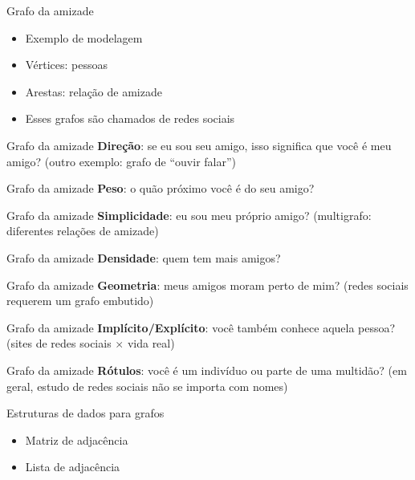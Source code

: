 \documentclass[10pt]{beamer}
\begin{document}
\begin{frame}{Grafo da amizade}
  \LARGE
  \begin{itemize}
    \item Exemplo de modelagem
    \item Vértices: pessoas
    \item Arestas: relação de amizade
    \item Esses grafos são chamados de redes sociais
  \end{itemize}
\end{frame}

\begin{frame}{Grafo da amizade}
  \huge
  \textbf{Direção}: se eu sou seu amigo, isso significa que você é meu amigo? (outro exemplo: grafo de ``ouvir falar'')
\end{frame}

\begin{frame}{Grafo da amizade}
  \huge
  \textbf{Peso}: o quão próximo você é do seu amigo?
\end{frame}

\begin{frame}{Grafo da amizade}
  \huge
  \textbf{Simplicidade}: eu sou meu próprio amigo? (multigrafo: diferentes relações de amizade)
\end{frame}

\begin{frame}{Grafo da amizade}
  \huge
  \textbf{Densidade}: quem tem mais amigos?
\end{frame}

\begin{frame}{Grafo da amizade}
  \huge
  \textbf{Geometria}: meus amigos moram perto de mim? (redes sociais requerem um grafo embutido)
\end{frame}

\begin{frame}{Grafo da amizade}
  \huge
  \textbf{Implícito/Explícito}: você também conhece aquela pessoa? (sites de redes sociais $\times$ vida real)
\end{frame}

\begin{frame}{Grafo da amizade}
  \huge
  \textbf{Rótulos}: você é um indivíduo ou parte de uma multidão? (em geral, estudo de redes sociais não se importa com nomes)
  \vfill
  \large
\end{frame}

\begin{frame}{Estruturas de dados para grafos}
  \huge
  \begin{itemize}
    \item Matriz de adjacência
    \item Lista de adjacência
  \end{itemize}
\end{frame}
\end{document}
